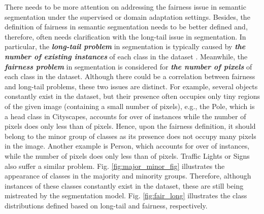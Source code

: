 \documentclass[10pt,twocolumn,letterpaper]{article}
\begin{document}
There needs to be more attention on addressing the fairness issue in semantic segmentation under the supervised or domain adaptation settings. Besides, the definition of fairness in semantic segmentation needs to be better defined and, therefore, often needs clarification with the long-tail issue in segmentation. In particular, the \textbf{\textit{long-tail problem}} in segmentation is typically caused by \textbf{\textit{the number of existing instances}} of each class in the dataset \cite{wang2021seesaw, DBLP:conf/aaai/Ting21}. Meanwhile, the \textbf{\textit{fairness problem}} in segmentation is considered for \textbf{\textit{the number of pixels}} of each class in the dataset.
Although there could be a correlation between fairness and long-tail problems, these two issues are distinct. For example, several objects constantly exist in the dataset, but their presence often occupies only tiny regions of the given image (containing a small number of pixels), 
e.g., the Pole, which is a head class in Cityscapes, accounts for over   of instances while the number of pixels does only less than  of pixels. 
Hence, upon the fairness definition, it should belong to the minor group of classes as its presence does not occupy many pixels in the image. 
Another example is Person, which accounts for over  of instances, while the number of pixels does only less than  of pixels. 
Traffic Lights or Signs also suffer a similar problem.
Fig. \ref{fig:major_minor_fig} illustrates the appearance of classes in the majority and minority groups.
Therefore, although instances of these classes constantly exist in the dataset, these are still being mistreated by the segmentation model. Fig. \ref{fig:fair_long} illustrates the class distributions defined based on long-tail and fairness, respectively.
\end{document}
